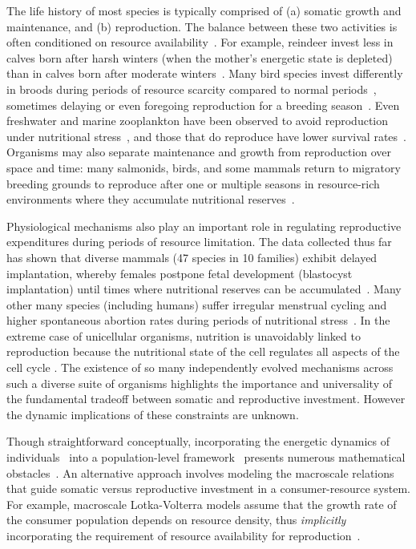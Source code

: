 \documentclass{pnastwo}
\begin{document}
\begin{article}
The life history of most species is typically comprised of (a) somatic growth
and maintenance, and (b) reproduction.  The balance between these two
activities is often conditioned on resource
availability~\cite{Morris:1987eo}.  For example, reindeer invest less in
calves born after harsh winters (when the mother's energetic state is
depleted) than in calves born after moderate winters~\cite{Tveraa:2003fq}.
Many bird species invest differently in broods during periods of resource
scarcity compared to normal periods~\cite{Daan:1988va,Jacot:2009dv},
sometimes delaying or even foregoing reproduction for a breeding
season~\cite{Martin:1987dl,Stearns:1989ip,Barboza:2002in}.  Even freshwater
and marine zooplankton have been observed to avoid reproduction under
nutritional stress~\cite{Threlkeld:1976ih}, and those that do reproduce have
lower survival rates~\cite{Kirk:1997cc}.  Organisms may also separate
maintenance and growth from reproduction over space and time: many salmonids,
birds, and some mammals return to migratory breeding grounds to reproduce
after one or multiple seasons in resource-rich environments where they
accumulate nutritional
reserves~\cite{Weber:1998jg,Mduma:1999cp,Moore:2014hi}.

Physiological mechanisms also play an important role in regulating
reproductive expenditures during periods of resource limitation.  The data
collected thus far has shown that diverse mammals (47 species in 10 families)
exhibit delayed implantation, whereby females postpone fetal development
(blastocyst implantation) until times where nutritional reserves can be
accumulated~\cite{Mead:1989dt,Sandell:1990kw}.  Many other many species
(including humans) suffer irregular menstrual cycling and higher spontaneous
abortion rates during periods of nutritional
stress~\cite{Bulik:1999eo,Trites:2003cc}.  In the extreme case of unicellular
organisms, nutrition is unavoidably linked to reproduction because the
nutritional state of the cell regulates all aspects of the cell cycle
\cite{Glazier:2009hq}.  The existence of so many independently evolved
mechanisms across such a diverse suite of organisms highlights the importance
and universality of the fundamental tradeoff between somatic and reproductive
investment.  However the dynamic implications of these constraints are
unknown.

Though straightforward conceptually, incorporating the energetic dynamics of
individuals~\cite{Kooi2000} into a population-level
framework~\cite{Kooi2000,Sousa:2010ez} presents numerous mathematical
obstacles~\cite{Diekmann:2010da}.  An alternative approach involves modeling
the macroscale relations that guide somatic versus reproductive investment in
a consumer-resource system.  For example, macroscale Lotka-Volterra models
assume that the growth rate of the consumer population depends on resource
density, thus \emph{implicitly} incorporating the requirement of resource
availability for reproduction~\cite{murdoch:2003}.


\end{article}
\end{document}
